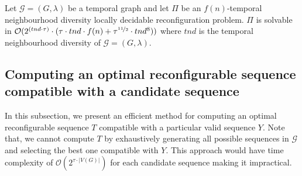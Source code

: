 
\begin{lemma*}
    Let $\mathcal{G}=(G,\lambda)$ be a temporal graph and let $\Pi$ be an $f(n)$-temporal neighbourhood diversity locally decidable reconfiguration problem. 
 $\Pi$ is solvable in $\mathcal{O}(2^{(tnd\cdot \tau)} \cdot (\tau\cdot tnd \cdot f(n) + \tau^{\nicefrac{11}{2}} \cdot tnd^8))$ where $tnd$ is the temporal neighbourhood diversity of $\mathcal{G}=(G,\lambda)$.
\end{lemma*}










\subsection{Computing an optimal reconfigurable sequence compatible with a candidate sequence}
\label{subsec:reconfiguration}

In this subsection, we present an efficient method for computing an optimal reconfigurable sequence $T$ compatible with a particular valid sequence $Y$. 
 Note that,  we cannot compute $T$ by exhaustively generating all possible sequences in $\mathcal{G}$ and selecting the best one compatible with $Y$. This approach would have time complexity of $\mathcal{O}(2^{\tau\cdot|V(G)|})$ for each candidate sequence making it impractical.
%

